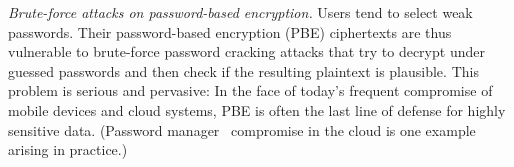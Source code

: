 {%

\begin{newitemize} 

\item{\em Brute-force attacks on password-based encryption.} Users tend to select weak
passwords. Their password-based encryption (PBE) ciphertexts are thus vulnerable
to brute-force password cracking attacks that try to decrypt under guessed passwords and
then check if the resulting plaintext is plausible.  This problem is serious and
pervasive: In the face of today's frequent compromise of
mobile devices and cloud systems, PBE is often the last line of defense for
highly sensitive data.  (Password manager~\cite{whitney11} compromise in the cloud is one example arising in practice.)
%





\end{newitemize}}
